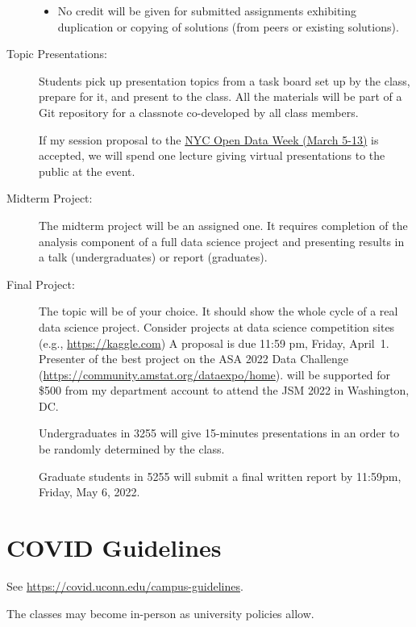 \documentclass{article}
\begin{document}
\begin{multicols}{2}
\begin{description}
\begin{itemize}
\item No credit will be given for submitted assignments exhibiting
  duplication or copying of solutions (from peers or existing
  solutions).
\end{itemize}

\item[Topic Presentations:]
  Students pick up presentation topics from a task board set up by the
  class, prepare for it, and present to the class. All the materials
  will be part of a Git repository for a classnote co-developed by all class
  members.

  If my session proposal to the \href{https://www.open-data.nyc}{NYC
    Open Data Week (March 5-13)} is accepted, we will spend one lecture
  giving virtual presentations to the public at the event.

\item[Midterm Project:]
  The midterm project will be an assigned one. It requires completion
  of the analysis component of a full data science project
  and presenting results in a talk (undergraduates) or report (graduates).
  
\item[Final Project:]
  The topic will be of your choice. It should show
  the whole cycle of a real data science project. Consider projects at
  data science competition sites (e.g., \url{https://kaggle.com})
  A proposal is due 11:59 pm, Friday, April~1.  Presenter of the best
  project on the ASA 2022 Data Challenge
  (\url{https://community.amstat.org/dataexpo/home}). will be
  supported for \$500
  from my department account to attend the JSM 2022 in Washington,
  DC.\@
  

  Undergraduates in 3255 will give 15-minutes presentations in an
  order to be randomly determined by the class.
  
  Graduate students in 5255 will submit a final written report by
  11:59pm, Friday, May 6, 2022.

\end{description}
\end{multicols}

\section*{COVID Guidelines}
  See \url{https://covid.uconn.edu/campus-guidelines}.

  The classes may become in-person as university policies allow.
\end{document}
